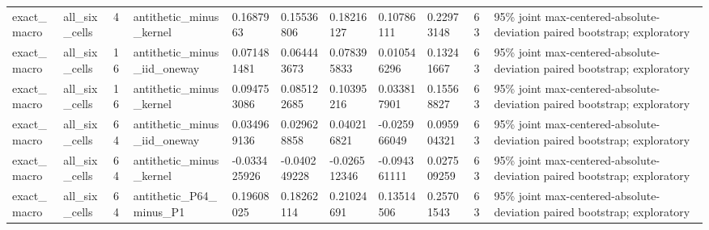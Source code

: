 \begin{tabular}{lllllllllll}
exact\_macro & all\_six\_cells & 4 & antithetic\_minus\_kernel & 0.1687963 & 0.15536806 & 0.18216127 & 0.10786111 & 0.22973148 & 63 & 95\% joint max-centered-absolute-deviation paired bootstrap; exploratory \\
exact\_macro & all\_six\_cells & 16 & antithetic\_minus\_iid\_oneway & 0.071481481 & 0.064443673 & 0.078395833 & 0.010546296 & 0.13241667 & 63 & 95\% joint max-centered-absolute-deviation paired bootstrap; exploratory \\
exact\_macro & all\_six\_cells & 16 & antithetic\_minus\_kernel & 0.094753086 & 0.085122685 & 0.10395216 & 0.033817901 & 0.15568827 & 63 & 95\% joint max-centered-absolute-deviation paired bootstrap; exploratory \\
exact\_macro & all\_six\_cells & 64 & antithetic\_minus\_iid\_oneway & 0.034969136 & 0.029628858 & 0.040216821 & -0.025966049 & 0.095904321 & 63 & 95\% joint max-centered-absolute-deviation paired bootstrap; exploratory \\
exact\_macro & all\_six\_cells & 64 & antithetic\_minus\_kernel & -0.033425926 & -0.040249228 & -0.026512346 & -0.094361111 & 0.027509259 & 63 & 95\% joint max-centered-absolute-deviation paired bootstrap; exploratory \\
exact\_macro & all\_six\_cells & 64 & antithetic\_P64\_minus\_P1 & 0.19608025 & 0.18262114 & 0.21024691 & 0.13514506 & 0.25701543 & 63 & 95\% joint max-centered-absolute-deviation paired bootstrap; exploratory \\
\bottomrule
\end{tabular}
